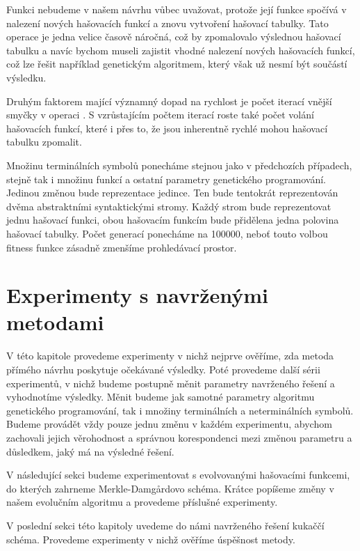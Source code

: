 Funkci  nebudeme v našem návrhu vůbec uvažovat, protože její funkce spočívá v nalezení
nových hašovacích funkcí a znovu vytvoření hašovací tabulky. Tato operace je jedna velice časově
náročná, což by zpomalovalo výslednou hašovací tabulku a navíc bychom museli zajistit vhodné nalezení
nových hašovacích funkcí, což lze řešit například genetickým algoritmem, který však už nesmí být
součástí výsledku.

Druhým faktorem mající významný dopad na rychlost je počet iterací vnější smyčky v operaci
. S vzrůstajícím počtem iterací roste také počet volání hašovacích funkcí, které
i přes to, že jsou inherentně rychlé mohou hašovací tabulku zpomalit.

Množinu terminálních
symbolů ponecháme stejnou jako v předchozích případech, stejně tak i množinu funkcí a ostatní parametry
genetického programování. Jedinou změnou bude reprezentace jedince. Ten bude tentokrát reprezentován
dvěma abstraktními syntaktickými stromy. Každý strom bude reprezentovat jednu hašovací funkci, obou
hašovacím funkcím bude přidělena jedna polovina hašovací tabulky. Počet generací ponecháme na 100000,
neboť touto volbou fitness funkce zásadně zmenšíme prohledávací prostor.

\chapter{Experimenty s navrženými metodami}

V této kapitole provedeme experimenty v nichž nejprve ověříme, zda metoda přímého návrhu poskytuje očekávané
výsledky. Poté provedeme další sérii experimentů, v nichž budeme postupně měnit parametry navrženého
řešení a vyhodnotíme výsledky. Měnit budeme jak samotné parametry algoritmu genetického
programování, tak i množiny terminálních a neterminálních symbolů. Budeme provádět vždy pouze
jednu změnu v každém experimentu, abychom zachovali jejich věrohodnost a správnou korespondenci
mezi změnou parametru a důsledkem, jaký má na výsledné řešení.

V následující sekci budeme experimentovat s evolvovanými hašovacími funkcemi, do kterých zahrneme
Merkle-Damg\r{a}rdovo schéma. Krátce popíšeme změny v našem evolučním algoritmu a provedeme příslušné
experimenty.

V poslední sekci této kapitoly uvedeme do námi navrženého řešení kukaččí schéma. Provedeme experimenty
v nichž ověříme úspěšnost metody.

